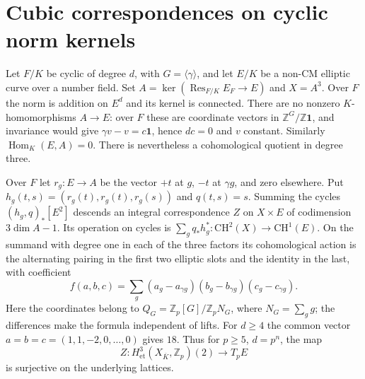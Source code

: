 \documentclass[11pt]{article}
\newcommand{\Z}{\mathbb Z}
\begin{document}
\section{Cubic correspondences on cyclic norm kernels}\label{sec:norm-exterior}
Let $F/K$ be cyclic of degree $d$, with $G=\langle\gamma\rangle$,
and let $E/K$ be a non-CM elliptic curve over a number field. Set
$A=\ker(\operatorname{Res}_{F/K}E_F\to E)$ and $X=A^3$.
Over $F$ the norm is addition on $E^d$ and its kernel is connected.
There are no nonzero $K$-homomorphisms $A\to E$: over $F$ these are
coordinate vectors in $\Z^G/\Z\mathbf1$, and invariance would give
$\gamma v-v=c\mathbf1$, hence $dc=0$ and $v$ constant. Similarly
$\operatorname{Hom}_K(E,A)=0$. There is nevertheless a cohomological
quotient in degree three.

Over $F$ let $r_g:E\to A$ be the vector $+t$ at $g$, $-t$ at
$\gamma g$, and zero elsewhere. Put
$h_g(t,s)=(r_g(t),r_g(t),r_g(s))$ and $q(t,s)=s$. Summing the cycles
$(h_g,q)_*[E^2]$ descends an integral correspondence $Z$ on $X\times E$
of codimension $3\dim A-1$. Its operation on cycles is
$\sum_g q_*h_g^*:\mathrm{CH}^2(X)\to\mathrm{CH}^1(E)$.
On the summand with degree one in each of the three factors its
cohomological action is the alternating pairing in the first two
elliptic slots and the identity in the last, with coefficient
\[
 f(a,b,c)=\sum_g(a_g-a_{\gamma g})(b_g-b_{\gamma g})(c_g-c_{\gamma g}).
\]
Here the coordinates belong to $Q_G=\Z_p[G]/\Z_p N_G$, where
$N_G=\sum_g g$; the differences make the formula independent of lifts.
For $d\ge4$ the common vector $a=b=c=(1,1,-2,0,\dots,0)$ gives $18$.
Thus for $p\ge5$, $d=p^n$, the map
\[
 Z:H^3_{\mathrm{et}}(X_{\overline K},\Z_p)(2)\longrightarrow
 T_p E
\]
is surjective on the underlying lattices.
\end{document}
